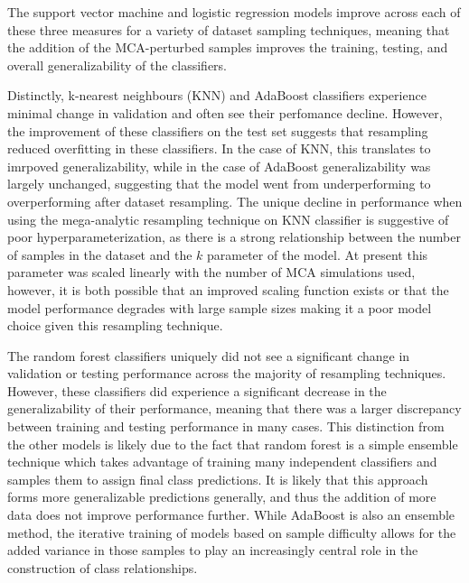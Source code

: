 \documentclass[10pt]{SelfArx} %
\begin{document}
The support vector machine and logistic regression models improve across each of these three measures for a variety of
dataset sampling techniques, meaning that the addition of the MCA-perturbed samples improves the training, testing, and
overall generalizability of the classifiers.

Distinctly, k-nearest neighbours (KNN) and AdaBoost classifiers experience minimal change in validation and often see
their perfomance decline. However, the improvement of these classifiers on the test set suggests that resampling
reduced overfitting in these classifiers. In the case of KNN, this translates to imrpoved generalizability, while in
the case of AdaBoost generalizability was largely unchanged, suggesting that the model went from underperforming to
overperforming after dataset resampling. The unique decline in performance when using the mega-analytic resampling
technique on KNN classifier is suggestive of poor hyperparameterization, as there is a strong relationship between the
number of samples in the dataset and the $k$ parameter of the model. At present this parameter was scaled linearly with
the number of MCA simulations used, however, it is both possible that an improved scaling function exists or that the
model performance degrades with large sample sizes making it a poor model choice given this resampling technique.

The random forest classifiers uniquely did not see a significant change in validation or testing performance across the
majority of resampling techniques. However, these classifiers did experience a significant decrease in the
generalizability of their performance, meaning that there was a larger discrepancy between training and testing
performance in many cases. This distinction from the other models is likely due to the fact that random forest is a
simple ensemble technique which takes advantage of training many independent classifiers and samples them to assign
final class predictions. It is likely that this approach forms more generalizable predictions generally, and thus the
addition of more data does not improve performance further. While AdaBoost is also an ensemble method, the iterative
training of models based on sample difficulty allows for the added variance in those samples to play an increasingly
central role in the construction of class relationships.
\end{document}
